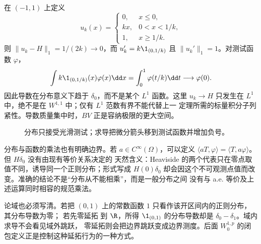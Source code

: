 \begin{example}[$p=1$ 端点的测度极限]\label{ex:4-3-2-4}
在 $(-1,1)$ 上定义
\[
 u_k(x)=
 \begin{cases}
 0,&x\leq0,\\
 kx,&0<x<1/k,\\
 1,&x\geq1/k.
 \end{cases}
\]
则 $\|u_k-H\|_1=1/(2k)\to0$，而
$u_k'=k\1_{(0,1/k)}$ 且 $\|u_k'\|_1=1$。对测试函数 $\varphi$，
\[
 \int k\1_{(0,1/k)}(x)\varphi(x)\dd x
 =\int_0^1\varphi(t/k)\dd t\longrightarrow\varphi(0).
\]
因此导数在分布意义下趋于 $\delta_0$，而不是某个 $L^1$ 函数。这里
$u_k\to H$ 只发生在 $L^1$ 中，绝不是在 $W^{1,1}$ 中；仅有 $L^1$ 范数有界不能代替上一
定理所需的标量积分子列紧性。导数质量集中时，$BV$ 正是容纳极限的更大空间。
\end{example}

\begin{figure}[htbp]
  \centering
  \caption{分布只接受光滑测试；求导把微分箭头移到测试函数并增加负号。}
  \label{fig:4-3-2-distribution-black-box}
\end{figure}

分布与函数的乘法也有明确边界。若 $a\in C^\infty(\Omega)$，可以定义
$\langle aT,\varphi\rangle=\langle T,a\varphi\rangle$。但 $H\delta_0$ 没有由现有等价关系决定的
天然含义：Heaviside 的两个代表只在零点取值不同，诱导同一个正则分布；形式写成
$H(0)\delta_0$ 却会因这个不可观测点值而改变。准确的结论不是“分布从不能相乘”，而是一般分布之间
没有与 a.e. 等价及上述运算同时相容的规范乘法。

论域也必须写清。若把 $(0,1)$ 上的常数函数 $1$ 只看作该开区间内的正则分布，其分布导数为零；
若先零延拓
到 $\R$，所得 $\1_{(0,1)}$ 的分布导数却是 $\delta_0-\delta_1$。域内求导不会看见域外跳跃，
零延拓则会把边界跳跃变成边界测度。后面 $W_0^{1,p}$ 的闭包定义正是控制这种延拓行为的一种方式。

